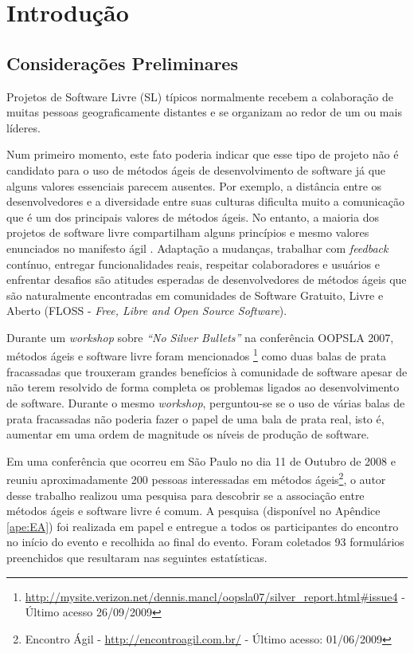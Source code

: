 \chapter{Introdução}
\label{cap:introducao}

\section{Considerações Preliminares}
\label{sec:consideracoes_preliminares}

Projetos de Software Livre (SL) típicos normalmente recebem a
colaboração de muitas pessoas geograficamente distantes
\cite{Dempsey1999} e se organizam ao redor de um ou mais líderes.

Num primeiro momento, este fato poderia indicar que esse tipo de
projeto não é candidato para o uso de métodos ágeis de desenvolvimento
de software já que alguns valores essenciais parecem ausentes. Por
exemplo, a distância entre os desenvolvedores e a diversidade entre
suas culturas dificulta muito a comunicação que é um dos principais
valores de métodos ágeis. No entanto, a maioria dos projetos de
software livre compartilham alguns princípios e mesmo valores
enunciados no manifesto ágil \cite{AgileManifesto}. Adaptação a
mudanças, trabalhar com \emph{feedback} contínuo, entregar
funcionalidades reais, respeitar colaboradores e usuários e enfrentar
desafios são atitudes esperadas de desenvolvedores de métodos ágeis
que são naturalmente encontradas em comunidades de Software Gratuito,
Livre e Aberto (FLOSS - \emph{Free, Libre and Open Source Software}).

Durante um \emph{workshop} \cite{OOPSLA07} sobre \emph{``No Silver
  Bullets''} \cite{Brooks1987} na conferência OOPSLA 2007, métodos
ágeis e software livre foram mencionados
\footnote{\url{http://mysite.verizon.net/dennis.mancl/oopsla07/silver_report.html\#issue4}
  - Último acesso 26/09/2009} como duas balas de prata fracassadas que
trouxeram grandes benefícios à comunidade de software apesar de não
terem resolvido de forma completa os problemas ligados ao
desenvolvimento de software. Durante o mesmo \emph{workshop},
perguntou-se se o uso de várias balas de prata fracassadas não poderia
fazer o papel de uma bala de prata real, isto é, aumentar em uma ordem
de magnitude os níveis de produção de software.

Em uma conferência que ocorreu em São Paulo no dia 11 de Outubro de
2008 e reuniu aproximadamente 200 pessoas interessadas em métodos
ágeis\footnote{Encontro Ágil - \url{http://encontroagil.com.br/} -
  Último acesso: 01/06/2009}, o autor desse trabalho realizou uma
pesquisa para descobrir se a associação entre métodos ágeis e software
livre é comum. A pesquisa (disponível no Apêndice \ref{ape:EA}) foi
realizada em papel e entregue a todos os participantes do encontro no
início do evento e recolhida ao final do evento. Foram coletados 93
formulários preenchidos que resultaram nas seguintes
estatísticas. %

